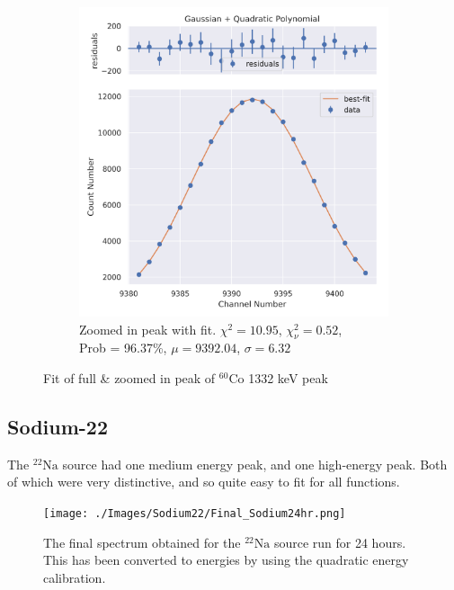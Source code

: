 \documentclass[11pt,a4paper]{article}
\newcommand{\element}[2]{$^{#2}\textrm{#1}$}
\begin{document}
\begin{figure}[H]
\begin{subfigure}{.5\linewidth}
    \includegraphics[width=\linewidth]{./Images/Cobalt60/Quad/Quad_2_Zoom.png}
    \caption{Zoomed in peak with fit. $\chi^2 = 10.95$, $\chi^2_\nu = 0.52$, \\ Prob = 96.37\%, $\mu = 9392.04$, $\sigma = 6.32$}
  \end{subfigure}
  \caption{Fit of full \& zoomed in peak of \element{Co}{60} 1332 keV peak}
\end{figure}
\clearpage


\subsection{Sodium-22}
The \element{Na}{22} source had one medium energy peak, and one high-energy peak. Both of which were very distinctive, and so quite easy to fit for all functions.
\begin{figure}[H]
  \centering
  \texttt{[image: ./Images/Sodium22/Final\_Sodium24hr.png]}
  \caption{The final spectrum obtained for the \element{Na}{22} source run for 24 hours. This has been converted to energies by using the quadratic energy calibration.}
\end{figure} 
\end{document}
